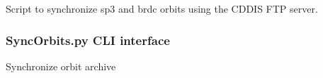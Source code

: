 \documentclass[letterpaper,10pt,english]{sphinxmanual}
\begin{document}
\sphinxAtStartPar
Script to synchronize sp3 and brdc orbits using the CDDIS FTP server.

\begin{fulllineitems}
\label{\detokenize{com:com.SyncOrbits.main}}
\pysigstartsignatures
{}
\pysigstopsignatures
\end{fulllineitems}



\subsubsection{SyncOrbits.py \sphinxhyphen{} CLI interface}
\label{\detokenize{com:SyncOrbits.py---CLI-interface}}
\sphinxAtStartPar
Synchronize orbit archive

\begin{sphinxVerbatim}[commandchars=\\\{\}]
 \PYG{p}{[}\PYG{p}{]} \PYG{p}{[}  \PYG{p}{[} \PYG{p}{]}\PYG{p}{]} \PYG{p}{[} \PYG{p}{]}
\end{sphinxVerbatim}
\end{document}

